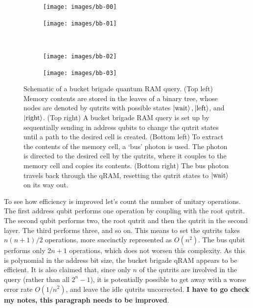 \documentclass[a4paper,12pt]{article}
\begin{document}
\begin{figure}
 \centering  
 \captionsetup{width=.89\linewidth}
 \begin{subfigure}{0.45\textwidth}
    \centering
    \texttt{[image: images/bb-00]}
 \end{subfigure}
  \hspace{0.5cm}
  \begin{subfigure}{0.45\textwidth}
    \centering
    \texttt{[image: images/bb-01]}
 \end{subfigure} \\
    \vspace{0.5cm}
     \begin{subfigure}{0.45\textwidth}
        \centering
        \texttt{[image: images/bb-02]}
    \end{subfigure}
    \hspace{0.5cm}
    \begin{subfigure}{0.45\textwidth}
        \centering
        \texttt{[image: images/bb-03]}
    \end{subfigure}
    \caption{Schematic of a bucket brigade quantum RAM query. 
    (Top left) Memory contents are stored in the leaves of a binary tree, whose nodes are denoted by qutrits with possible states $\ket{\hbox{wait}}, \ket{\hbox{left}}$, and $\ket{\hbox{right}}$. 
    (Top right) A bucket brigade RAM query is set up by sequentially sending in address qubits to change the qutrit states until a path to the desired cell is created. 
    (Bottom left) To extract the contents of the memory cell, a `bus' photon is used.
    The photon is directed to the desired cell by the qutrits, where it couples to the memory cell and copies its contents. 
    (Bottom right) The bus photon travels back through the qRAM, resetting the qutrit states to $\ket{\hbox{wait}}$ on its way out.}
    \label{fig:bb-sequence}
\end{figure}



To see how efficiency is improved let's count the number of unitary operations.
The first address qubit performs one operation by coupling with the root qutrit.
The second qubit performs two, the root qutrit and then the qutrit in the second layer. The third performs three, and so on.
This means to set the qutrits takes $n(n+1)/2$ operations, more succinctly represented as $O(n^2)$. 
The bus qubit performs only $2n + 1$ operations, which does not worsen this complexity. 
As this is polynomial in the address bit size, the bucket brigade qRAM appears to be efficient. 
It is also claimed that, since only $n$ of the qutrits are involved in the query (rather than all $2^n-1$), it is potentially possible to get away with a worse error rate $O(1/n^2)$, and leave the idle qutrits uncorrected. 
\textbf{I have to go check my notes, this paragraph needs to be improved}.
\end{document}
